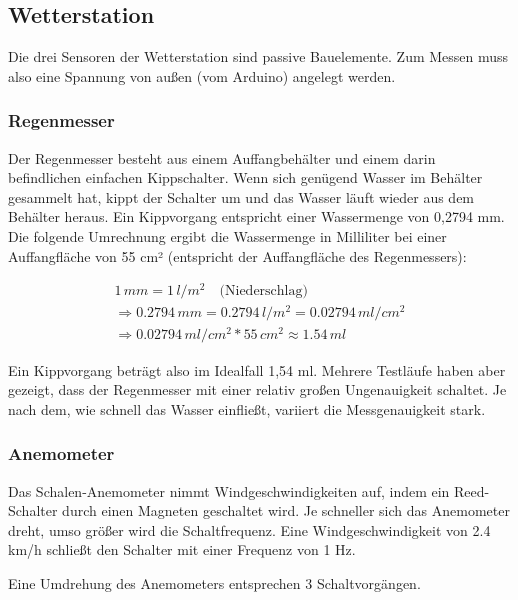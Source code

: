 \documentclass[12pt]{article}
\begin{document}
    \subsection{Wetterstation} \label{sensors}
    Die drei Sensoren der Wetterstation sind passive Bauelemente.
    Zum Messen muss also eine Spannung von außen (vom Arduino) angelegt werden.


    
      \subsubsection{Regenmesser}
        Der Regenmesser besteht aus einem Auffangbehälter und einem darin befindlichen einfachen Kippschalter.
        Wenn sich genügend Wasser im Behälter gesammelt hat, kippt der Schalter um und das Wasser läuft wieder aus dem Behälter heraus.
        Ein Kippvorgang entspricht einer Wassermenge von 0,2794 mm.
        Die folgende Umrechnung ergibt die Wassermenge in Milliliter bei einer Auffangfläche von 55 cm² (entspricht der Auffangfläche des Regenmessers):

        \begin{multline}
          1\,mm = 1\,l/m^2 \quad \text{(Niederschlag)} \\
          \Rightarrow 0.2794\,mm = 0.2794\,l/m^2 = 0.02794\,ml/cm^2 \\
          \Rightarrow 0.02794\,ml/cm^2 * 55\,cm^2 \approx 1.54\,ml
        \end{multline}

        Ein Kippvorgang beträgt also im Idealfall 1,54 ml.
        Mehrere Testläufe haben aber gezeigt, dass der Regenmesser mit einer relativ großen Ungenauigkeit schaltet.
        Je nach dem, wie schnell das Wasser einfließt, variiert die Messgenauigkeit stark.



      \subsubsection{Anemometer}
        Das Schalen-Anemometer nimmt Windgeschwindigkeiten auf, indem ein Reed-Schalter durch einen Magneten geschaltet wird.
        Je schneller sich das Anemometer dreht, umso größer wird die Schaltfrequenz.
        Eine Windgeschwindigkeit von 2.4 km/h schließt den Schalter mit einer Frequenz von 1 Hz.

        Eine Umdrehung des Anemometers entsprechen 3 Schaltvorgängen.
\end{document}

